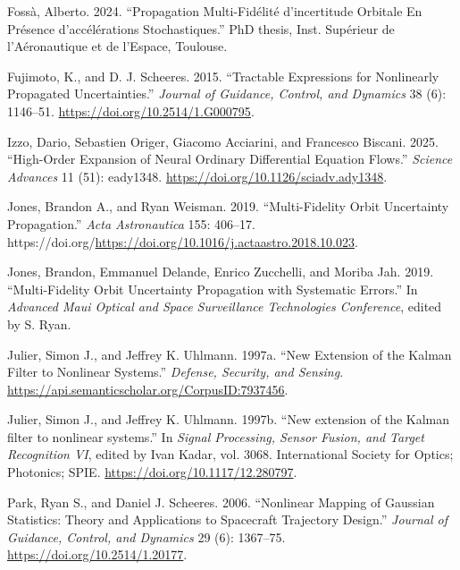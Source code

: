 \documentclass[
  letterpaper,
  DIV=11,
  numbers=noendperiod,
  oneside]{scrartcl}
\newlength{\cslhangindent}
\newenvironment{CSLReferences}[2] %
 {\begin{list}{}{%
  \setlength{\itemindent}{0pt}
  \setlength{\leftmargin}{0pt}
  \setlength{\parsep}{0pt}
  \ifodd #1
   \setlength{\leftmargin}{\cslhangindent}
   \setlength{\itemindent}{-1\cslhangindent}
  \fi
  \setlength{\itemsep}{#2\baselineskip}}}
 {\end{list}}
\begin{document}
\begin{CSLReferences}{1}{1}
Fossà, Alberto. 2024. {``Propagation Multi-Fid{é}lit{é} d'incertitude
Orbitale En Pr{é}sence d'acc{é}l{é}rations Stochastiques.''} PhD thesis,
Inst. Sup{é}rieur de l'A{é}ronautique et de l'Espace, Toulouse.

Fujimoto, K., and D. J. Scheeres. 2015. {``Tractable Expressions for
Nonlinearly Propagated Uncertainties.''} \emph{Journal of Guidance,
Control, and Dynamics} 38 (6): 1146--51.
\url{https://doi.org/10.2514/1.G000795}.

Izzo, Dario, Sebastien Origer, Giacomo Acciarini, and Francesco Biscani.
2025. {``High-Order Expansion of Neural Ordinary Differential Equation
Flows.''} \emph{Science Advances} 11 (51): eady1348.
\url{https://doi.org/10.1126/sciadv.ady1348}.

Jones, Brandon A., and Ryan Weisman. 2019. {``Multi-Fidelity Orbit
Uncertainty Propagation.''} \emph{Acta Astronautica} 155: 406--17.
https://doi.org/\url{https://doi.org/10.1016/j.actaastro.2018.10.023}.

Jones, Brandon, Emmanuel Delande, Enrico Zucchelli, and Moriba Jah.
2019. {``{Multi-Fidelity Orbit Uncertainty Propagation with Systematic
Errors}.''} In \emph{Advanced Maui Optical and Space Surveillance
Technologies Conference}, edited by S. Ryan.

Julier, Simon J., and Jeffrey K. Uhlmann. 1997a. {``New Extension of the
Kalman Filter to Nonlinear Systems.''} \emph{Defense, Security, and
Sensing}. \url{https://api.semanticscholar.org/CorpusID:7937456}.

Julier, Simon J., and Jeffrey K. Uhlmann. 1997b. {``{New extension of
the Kalman filter to nonlinear systems}.''} In \emph{Signal Processing,
Sensor Fusion, and Target Recognition VI}, edited by Ivan Kadar, vol.
3068. International Society for Optics; Photonics; SPIE.
\url{https://doi.org/10.1117/12.280797}.

Park, Ryan S., and Daniel J. Scheeres. 2006. {``Nonlinear Mapping of
Gaussian Statistics: Theory and Applications to Spacecraft Trajectory
Design.''} \emph{Journal of Guidance, Control, and Dynamics} 29 (6):
1367--75. \url{https://doi.org/10.2514/1.20177}.


\end{CSLReferences}
\end{document}
